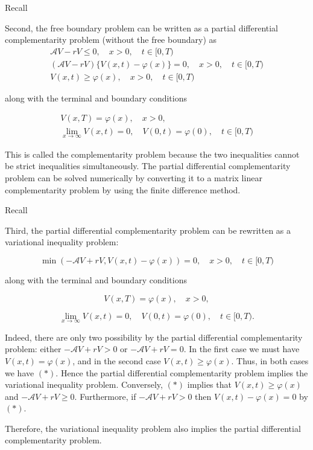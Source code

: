 \documentclass{beamer}
\begin{document}
\begin{frame}{Recall}

    {\footnotesize \footnotesize
    Second, the free boundary problem can be written as a partial differential complementarity problem (without the free boundary) as
    \begin{gather*}
        \mathcal{A} V - rV  \leq  0, \quad x > 0, \quad t \in [0,T) \\
    (\mathcal{A} V - rV) \{ V(x,t) - \varphi(x) \}  =  0, \quad x > 0, \quad t \in [0,T) \\
    V(x,t)  \geq \varphi(x), \quad x > 0, \quad t \in [0,T)
    \end{gather*}
    
    along with the terminal and boundary conditions

    \begin{gather*}
        V(x,T)  =  \varphi(x), \quad x > 0, \\
    \lim_{x \to \infty} V(x,t)  =  0, \quad V(0,t) = \varphi(0), \quad t \in [0,T)
    \end{gather*}

     \pause This is called the complementarity problem because the two inequalities cannot be strict 
    inequalities simultaneously. The partial differential complementarity problem can be solved 
    numerically by converting it to a matrix linear 
    complementarity problem by using the finite difference method.
        }
\end{frame}

\begin{frame}{Recall}

    {\footnotesize \footnotesize
    Third, the partial differential complementarity problem can be rewritten as a variational inequality problem:

    \[
    \min(-\mathcal{A} V + rV, V(x,t) - \varphi(x)) = 0, \quad x > 0, \quad t \in [0,T) \tag{*}
    \]

    along with the terminal and boundary conditions

    \[
    V(x,T) = \varphi(x), \quad x > 0,
    \]

    \[
    \lim_{x \to \infty} V(x,t) = 0, \quad V(0,t) = \varphi(0), \quad t \in [0,T).
    \]

     \pause Indeed, there are only two possibility by the partial differential complementarity 
    problem: either \(-\mathcal{A} V + rV > 0\) or \(-\mathcal{A} V + rV = 0\). In the first case we must 
    have \(V(x,t) = \varphi(x)\), and in the second case \(V(x,t) \geq \varphi(x)\). Thus, 
    in both cases we have $(*)$. Hence the partial differential complementarity problem 
    implies the variational inequality problem.  Conversely, $(*)$ implies that \(V(x,t) \geq \varphi(x)\) 
    and \(-\mathcal{A} V + rV \geq 0\). Furthermore, if \(-\mathcal{A}V + rV > 0\) then \(V(x,t) - \varphi(x) = 0\) by $(*)$. 
    \par Therefore, the variational inequality problem also implies the partial differential complementarity problem.
        }
\end{frame}
\end{document}
